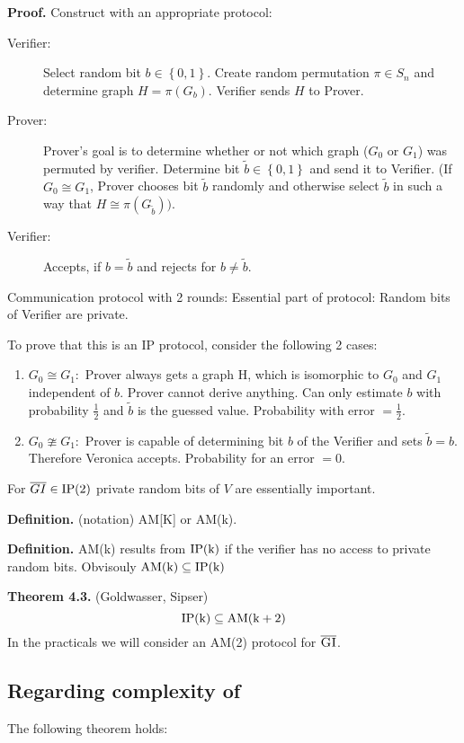 \documentclass[a4paper]{article}
\newcommand{\cls}[1]{\rm{#1}}
\newcommand{\probl}[1]{\text{\textsc{#1}}}
\newcommand{\set}[1]{\left\{#1\right\}}
\begin{document}
\textbf{Proof.}
  Construct with an appropriate protocol:
\begin{description}
  \item[Verifier:] Select random bit $b \in \set{0,1}$.
      Create random permutation $\pi \in S_n$ and determine graph $H = \pi(G_b)$.
      Verifier sends $H$ to Prover.
  \item[Prover:] Prover's goal is to determine whether or not which graph ($G_0$ or $G_1$)
      was permuted by verifier. Determine bit $\tilde{b} \in \set{0,1}$ and send
      it to Verifier. (If $G_0 \cong G_1$, Prover chooses bit $\tilde{b}$ randomly
      and otherwise select $\tilde{b}$ in such a way that $H \cong
      \pi(G_{\tilde{b}}))$.
  \item[Verifier:] Accepts, if $b = \tilde{b}$ and rejects for $b \neq \tilde{b}$.
\end{description}

Communication protocol with 2 rounds:
Essential part of protocol: Random bits of Verifier are private.

To prove that this is an \cls{IP} protocol, consider the following 2 cases:
\begin{enumerate}
  \item $G_0 \cong G_1:$ Prover always gets a graph H, which is isomorphic to
        $G_0$ and $G_1$ independent of $b$. Prover cannot derive anything.
        Can only estimate $b$ with probability $\frac12$ and $\tilde{b}$ is
        the guessed value. Probability with error $=\frac12$.
  \item $G_0 \ncong G_1:$
        Prover is capable of determining bit $b$ of the Verifier and sets
        $\tilde{b} = b$. Therefore Veronica accepts. Probability for an error $= 0$.
\end{enumerate}

For $\overline{GI} \in \cls{IP}(2)$ private random bits of $V$ are
essentially important.

\textbf{Definition.} (notation) AM[K] or AM(k).

\textbf{Definition.}
  AM(k) results from $\cls{IP}(k)$ if the verifier has no access
  to private random bits. Obvisouly $\cls{AM(k)} \subseteq \cls{IP(k)}$

\textbf{Theorem 4.3.} (Goldwasser, Sipser)
\[
  \cls{IP}(k) \subseteq \cls{AM}(k+2)
\]
%
In the practicals we will consider an AM(2) protocol for $\overline{\probl{GI}}$.

\subsection{Regarding complexity of \probl{GI}}
%
The following theorem holds:
\end{document}
